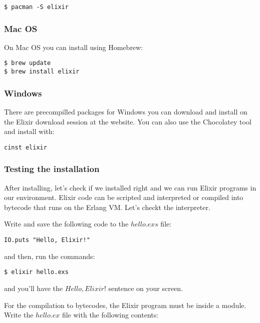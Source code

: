 \begin{verbatim}
$ pacman -S elixir
\end{verbatim}

\subsubsection{Mac OS}

On Mac OS you can install using Homebrew:

\begin{verbatim}
$ brew update
$ brew install elixir
\end{verbatim}

\subsubsection{Windows}

There are precompilled packages for Windows you can download and install on the
Elixir download session at the website. You can also use the Chocolatey tool
and install with:

\begin{verbatim}
cinst elixir
\end{verbatim}

\subsubsection{Testing the installation}

After installing, let's check if we installed right and we can run Elixir
programs in our environment. Elixir code can be scripted and interpreted or
compiled into bytecode that runs on the Erlang VM. Let's checkt the interpreter.

Write and save the following code to the $hello.exs$ file:

\begin{lstlisting}[label=ehw,caption=Elixir Hello World]
IO.puts "Hello, Elixir!"
\end{lstlisting}

and then, run the commands:

\begin{verbatim}
$ elixir hello.exs
\end{verbatim}

and you'll have the $Hello, Elixir!$ sentence on your screen.

For the compilation to bytecodes, the Elixir program must be inside a module.
Write the $hello.ex$ file with the following contents:

